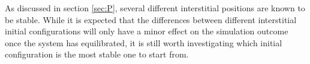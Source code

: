 \documentclass[11pt,bibliography=totoc,index=totoc]{scrbook}   %
\begin{document}
As discussed in section \ref{sec:P}, several different interstitial positions are known to be stable.
While it is expected that the differences between different interstitial initial configurations
will only have a minor effect on the simulation outcome once the system has equilibrated,
it is still worth investigating which initial configuration is the most stable one to start from.


\begin{figure}[htbp]
  \centering
  \\
\end{figure}
\end{document}
